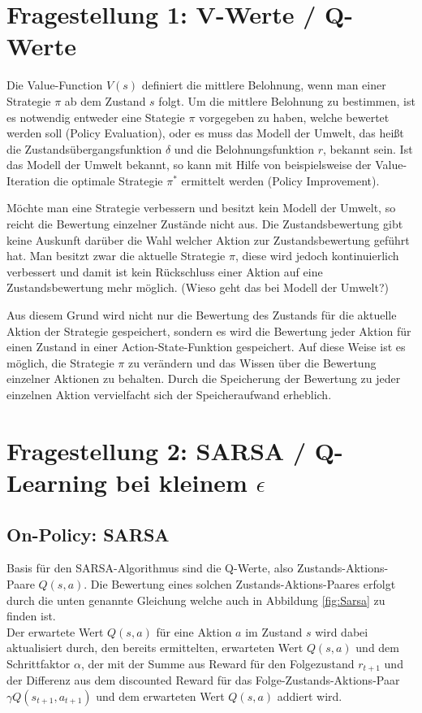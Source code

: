 \documentclass[10pt]{scrartcl}
\author{Pascal Jäger, Stefan Münchow, Armin Steudte,\\ Milena Rötting, Svend-Anjes Pahl, Carsten Noetzel, Oliver Steenbuck}
\title{\titletext}
\date{01.06.2012}
\begin{document}
\maketitle

\setcounter{tocdepth}{3}
\tableofcontents
\listoffigures

\section{Fragestellung 1: V-Werte / Q-Werte}
Die Value-Function $V(s)$ definiert die mittlere Belohnung, wenn man einer Strategie $\pi$ ab dem Zustand $s$ folgt. Um die mittlere Belohnung zu bestimmen, ist es notwendig entweder eine Stategie $\pi$ vorgegeben zu haben, welche bewertet werden soll (Policy Evaluation), oder es muss das Modell der Umwelt, das heißt die Zustandsübergangsfunktion $\delta$ und die Belohnungsfunktion $r$, bekannt sein. Ist das Modell der Umwelt bekannt, so kann mit Hilfe von beispielsweise der Value-Iteration die optimale Strategie $\pi^*$ ermittelt werden (Policy Improvement).

Möchte man eine Strategie verbessern und besitzt kein Modell der Umwelt, so reicht die Bewertung einzelner Zustände nicht aus. Die Zustandsbewertung gibt keine Auskunft darüber die Wahl welcher Aktion zur Zustandsbewertung geführt hat. Man besitzt zwar die aktuelle Strategie $\pi$, diese wird jedoch kontinuierlich verbessert und damit ist kein Rückschluss einer Aktion auf eine Zustandsbewertung mehr möglich. (Wieso geht das bei Modell der Umwelt?)

Aus diesem Grund wird nicht nur die Bewertung des Zustands für die aktuelle Aktion der Strategie gespeichert, sondern es wird die Bewertung jeder Aktion für einen Zustand in einer Action-State-Funktion gespeichert. Auf diese Weise ist es möglich, die Strategie $\pi$ zu verändern und das Wissen über die Bewertung einzelner Aktionen zu behalten. Durch die Speicherung der Bewertung zu jeder einzelnen Aktion vervielfacht sich der Speicheraufwand erheblich.

\section{Fragestellung 2: SARSA / Q-Learning bei kleinem $\epsilon$}
\subsection{On-Policy: SARSA}
Basis für den SARSA-Algorithmus sind die Q-Werte, also Zustands-Aktions-Paare $Q(s,a)$. Die Bewertung eines solchen Zustands-Aktions-Paares erfolgt durch die unten genannte Gleichung welche auch in Abbildung \ref{fig:Sarsa} zu finden ist.\\
Der erwartete Wert $Q(s,a)$ für eine Aktion $a$ im Zustand $s$ wird dabei aktualisiert durch, den bereits ermittelten, erwarteten Wert $Q(s,a)$ und dem Schrittfaktor $\alpha$, der mit der Summe aus Reward für den Folgezustand $r_{t+1}$ und der Differenz aus dem discounted Reward für das Folge-Zustands-Aktions-Paar $\gamma Q(s_{t+1}, a_{t+1})$ und dem erwarteten Wert $Q(s,a)$ addiert wird.\\
\end{document}
